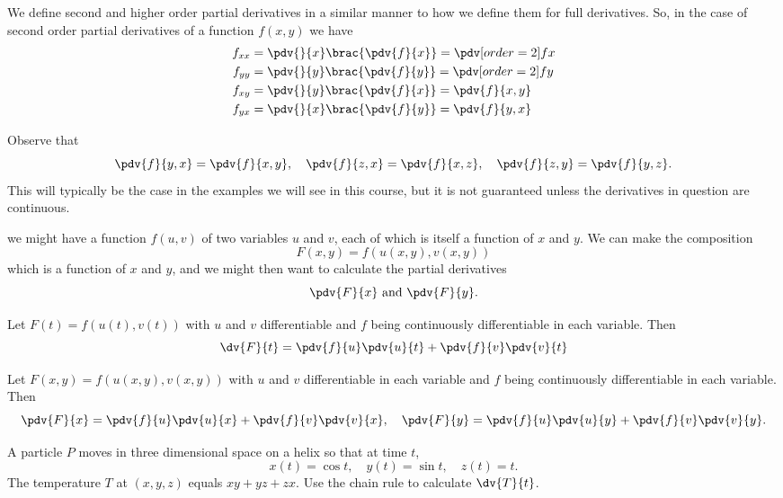 We define second and higher order partial derivatives in a similar manner to how we define them for full derivatives. So, in the case of second order partial derivatives of a function $f(x,y)$ we have
\[ \begin{split}
f_{xx} &= \pdv{}{x}\brac{\pdv{f}{x}} = \pdv[order={2}]{f}{x} \\
f_{yy} &= \pdv{}{y}\brac{\pdv{f}{y}} = \pdv[order={2}]{f}{y} \\
f_{xy} &= \pdv{}{y}\brac{\pdv{f}{x}} = \pdv{f}{x,y} \\
f_{yx} &= \pdv{}{x}\brac{\pdv{f}{y}} = \pdv{f}{y,x}
\end{split} \]

Observe that
\[ \pdv{f}{y,x}=\pdv{f}{x,y}, \quad \pdv{f}{z,x}=\pdv{f}{x,z}, \quad \pdv{f}{z,y}=\pdv{f}{y,z}. \]
This will typically be the case in the examples we will see in this course, but it is not guaranteed unless the derivatives in question are continuous.

we might have a function $f(u,v)$ of two variables $u$ and $v$, each of which is itself a function of $x$ and $y$. We can make the composition
\[ F(x,y)=f(u(x,y),v(x,y)) \]
which is a function of $x$ and $y$, and we might then want to calculate the partial derivatives
\[ \pdv{F}{x}\text{ and }\pdv{F}{y}. \]

\begin{theorem}
Let $F(t)=f(u(t),v(t))$ with $u$ and $v$ differentiable and $f$ being continuously differentiable in each variable. Then
\begin{equation}
\dv{F}{t}=\pdv{f}{u}\pdv{u}{t}+\pdv{f}{v}\pdv{v}{t}
\end{equation}
\end{theorem}

\begin{corollary}
Let $F(x,y)=f(u(x,y),v(x,y))$ with $u$ and $v$ differentiable in each variable and $f$ being continuously differentiable in each variable. Then
\[ \pdv{F}{x}=\pdv{f}{u}\pdv{u}{x}+\pdv{f}{v}\pdv{v}{x}, \quad \pdv{F}{y}=\pdv{f}{u}\pdv{u}{y}+\pdv{f}{v}\pdv{v}{y}. \]
\end{corollary}

\begin{exercise}
A particle $P$ moves in three dimensional space on a helix so that at time $t$,
\[ x(t)=\cos t, \quad y(t)=\sin t, \quad z(t)=t. \]
The temperature $T$ at $(x,y,z)$ equals $xy+yz+zx$. Use the chain rule to calculate $\dv{T}{t}$.
\end{exercise}

